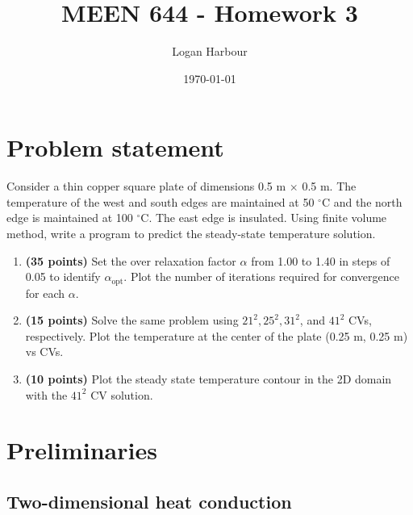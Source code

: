 \documentclass{article}
\newcommand{\pageTitle}{MEEN 644 - Homework 3}
\newcommand{\pageAuthor}{Logan Harbour}
\begin{document}
\title{\LARGE \textbf{\pageTitle} \vspace{-0.3cm}}
\author{\large \pageAuthor}
\date{\vspace{-0.6cm} \large \today \vspace{-0.4cm}}

\maketitle

\section*{Problem statement}

Consider a thin copper square plate of dimensions 0.5 m $\times$ 0.5 m. The temperature of the west and south edges are maintained at 50 $^\circ$C and the north edge is maintained at 100 $^\circ$C. The east edge is insulated. Using finite volume method, write a program to predict the steady-state temperature solution.

\begin{enumerate}[label=(\alph*)]
	\item \textbf{(35 points)} Set the over relaxation factor $\alpha$ from 1.00 to 1.40 in steps of 0.05 to identify $\alpha_\text{opt}$. Plot the number of iterations required for convergence for each $\alpha$.
	\item \textbf{(15 points)} Solve the same problem using $21^2, 25^2, 31^2$, and $41^2$ CVs, respectively. Plot the temperature at the center of the plate (0.25 m, 0.25 m) vs CVs.
	\item \textbf{(10 points)} Plot the steady state temperature contour in the 2D domain with the $41^2$ CV solution.
\end{enumerate}

\section*{Preliminaries}

\subsection*{Two-dimensional heat conduction}
\end{document}
